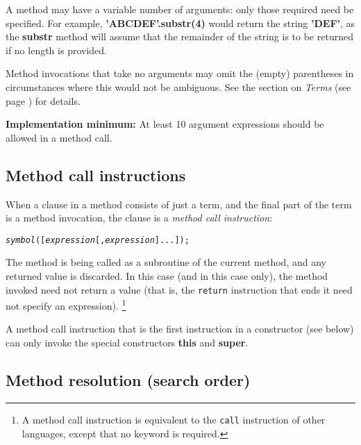 A method may have a variable number of arguments: only those
required need be specified.
For example, \textbf{'ABCDEF'.substr(4)} would return the
string \textbf{'DEF'}, as the \textbf{substr} method will assume
that the remainder of the string is to be returned if no length is
provided.
 
Method invocations that take no arguments may omit the (empty)
parentheses in circumstances where this would not be ambiguous.
See the section on  \emph{Terms} (see page \pageref{refterms})  for details.
 
\textbf{Implementation minimum:} At least 10 argument expressions
should be allowed in a method call.
\subsection{Method call instructions}\label{"id"}
 
When a clause in a method consists of just a term, and the final part of
the term is a method invocation, the clause is a \emph{method call
instruction}:
\begin{shaded}
\begin{alltt}
\emph{symbol}([\emph{expression}[,\emph{expression}]...]);
\end{alltt}
\end{shaded}
The method is being called as a subroutine of the current method, and
any returned value is discarded.
In this case (and in this case only), the method invoked need not return
a value (that is, the \texttt{return} instruction that ends it need not
specify an expression).
\footnote{
A method call instruction is equivalent to the \texttt{call} instruction
of other languages, except that no keyword is required.
}
 
A method call instruction that is the first instruction in a constructor
(see below) can only invoke the special constructors \textbf{this}
and \textbf{super}.
\subsection{Method resolution (search order)}\label{"id"}
 
